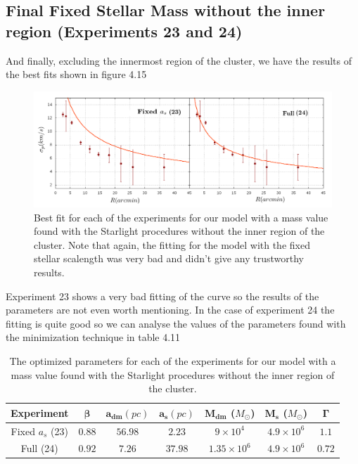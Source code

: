 \subsection{Final Fixed Stellar Mass without the inner region (Experiments 23 and 24)}

And finally, excluding the innermost region of the cluster, we have the results of the best fits shown in figure 4.15

\begin{figure}[H]
\centering
\includegraphics[width=15cm]{images/Starlight_25_10.png}
\caption[Best fits for our model with a mass value based on the Starlight procedures without the inner region.]{Best fit for each of the experiments for our model with a mass value found with the Starlight procedures without the inner region of the cluster. Note that again, the fitting for the model with the fixed stellar scalength was very bad and didn't give any trustworthy results.}
\end{figure}

Experiment 23 shows a very bad fitting of the curve so the results of the parameters are not even worth mentioning. In the case of experiment 24 the fitting is quite good so we can analyse the values of the parameters found with the minimization technique in table 4.11

\begin{table}[H]
\centering
\begin{tabular}{| c| c| c| c| c| c| c|}
    \hline
    \textbf{Experiment} & $\mathbf{\beta}$ & $\mathbf{a_{dm}} (pc)$ & $\mathbf{a_{s}} (pc)$ & $\mathbf{M_{dm}}$ ($M_{\odot}$) & $\mathbf{M_{s}}$ ($M_{\odot}$) & $\mathbf{\Gamma}$\\ \hline
	Fixed $a_s$ (23) &	$0.88$ &	$56.98$ &	$2.23$ &	$9 \times 10^{4}$ &	$4.9 \times 10 ^{6}$ &	$1.1$\\ \hline
	Full (24) &	$0.92$ &	$7.26$ &	$37.98$ &	$1.35 \times 10^{6}$ &	$4.9 \times 10^{6}$ &	$0.72$\\ \hline
  \end{tabular} 
\caption[Optimized parameters for our model with a mass value based on the Starlight procedures without the inner region.]{The optimized parameters for each of the experiments for our model with a mass value found with the Starlight procedures without the inner region of the cluster.} 
\end{table}

